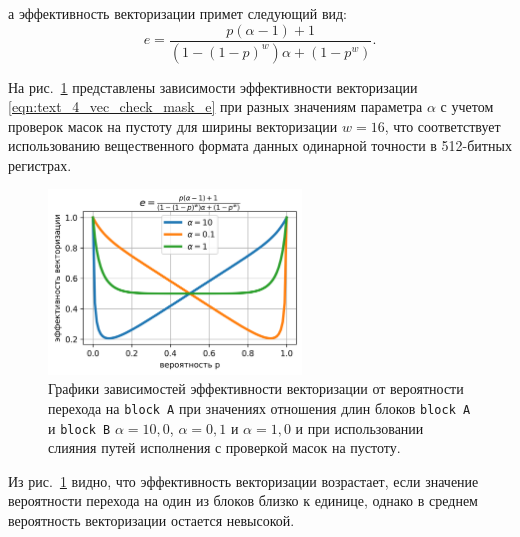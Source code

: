 а эффективность векторизации примет следующий вид:
\begin{equation}\label{eqn:text_4_vec_check_mask_e}
	e = \frac{ p(\alpha - 1) + 1 }{\left(1 - (1 - p)^w\right) \alpha + (1 - p^w) }.
\end{equation}

На рис.~\ref{fig:text_4_vec_check_mask_chart_e_merged} представлены зависимости эффективности векторизации \eqref{eqn:text_4_vec_check_mask_e} при разных значениям параметра $\alpha$ с учетом проверок масок на пустоту для ширины векторизации $w = 16$, что соответствует использованию вещественного формата данных одинарной точности в 512-битных регистрах.

\begin{figure}[ht]
	\centering
		\includegraphics[width=0.6\textwidth]{./pics/text_4_vec_check_mask/chart_e_merged.png}
	\caption{Графики зависимостей эффективности векторизации от вероятности перехода на \texttt{block A} при значениях отношения длин блоков \texttt{block A} и \texttt{block B} $\alpha = 10,0$, $\alpha = 0,1$ и $\alpha = 1,0$ и при использовании слияния путей исполнения с проверкой масок на пустоту.}
	\label{fig:text_4_vec_check_mask_chart_e_merged}
\end{figure}

Из рис.~\ref{fig:text_4_vec_check_mask_chart_e_merged} видно, что эффективность векторизации возрастает, если значение вероятности перехода на один из блоков близко к единице, однако в среднем вероятность векторизации остается невысокой.
